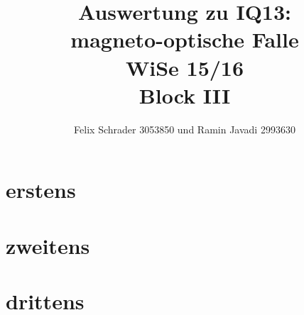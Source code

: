\documentclass[12pt,a4paper]{article}
\title{Auswertung zu IQ13:\\
       magneto-optische Falle\\
       WiSe 15/16\\
       Block III}
\author{Felix Schrader 3053850 und Ramin Javadi 2993630}
\date{}
\begin{document}
\maketitle
\tableofcontents
\pagebreak
\section{erstens}
\section{zweitens}
\section{drittens}
\end{document}
